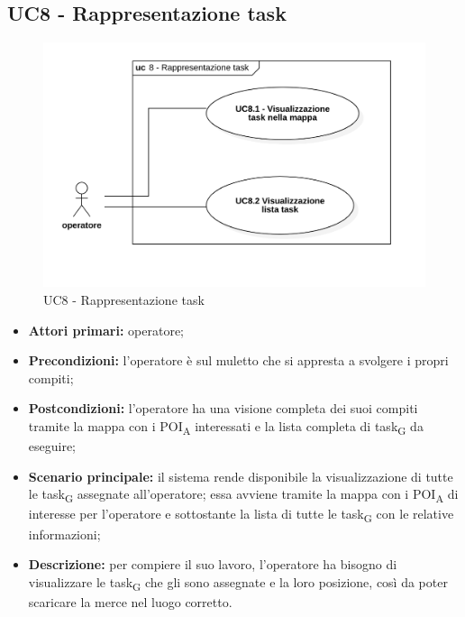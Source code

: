 \subsection{UC8 - Rappresentazione task}

\begin{figure}[H]
	\centering
	\includegraphics[scale=0.52]{res/images/uc8.png}
	\caption{UC8 - Rappresentazione task}
\end{figure}


\begin{itemize}
	\item 	\textbf{Attori primari:} operatore;
	\item 	\textbf{Precondizioni:} l'operatore è sul muletto che si appresta a svolgere i propri compiti;
	\item 	\textbf{Postcondizioni:} l'operatore ha una visione completa dei suoi compiti tramite la mappa con i POI\textsubscript{A} interessati e la lista completa di task\textsubscript{G} da eseguire;
	\item 	\textbf{Scenario principale:} il sistema rende disponibile la visualizzazione di tutte le task\textsubscript{G} assegnate all'operatore; essa avviene tramite la mappa con i POI\textsubscript{A} di interesse per l'operatore e sottostante la lista di tutte le task\textsubscript{G} con le relative informazioni;
	\item 	\textbf{Descrizione:} per compiere il suo lavoro, l'operatore ha bisogno di visualizzare le task\textsubscript{G} che gli sono assegnate e la loro posizione, così da poter scaricare la merce nel luogo corretto.

\end{itemize}

